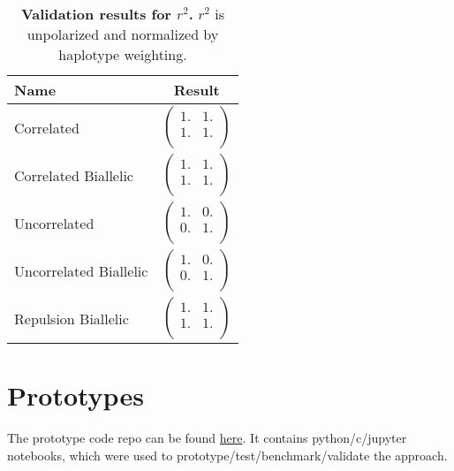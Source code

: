 \documentclass[12pt]{article}
\begin{document}
\begin{table}[H]
  \begin{tabular}{lc} Name & Result \\
    \hline
    Correlated & $\left(\begin{array}{cc}
                          1. & 1. \\
                          1. & 1. \\
                        \end{array}\right)$ \\
    Correlated Biallelic & $\left(\begin{array}{cc}
                                    1. & 1. \\
                                    1. & 1. \\
                                  \end{array}\right)$ \\
    Uncorrelated & $\left(\begin{array}{cc}
                            1. & 0. \\
                            0. & 1. \\
                          \end{array}\right)$ \\
    Uncorrelated Biallelic & $\left(\begin{array}{cc}
                                      1. & 0. \\
                                      0. & 1. \\
                                    \end{array}\right)$ \\
    Repulsion Biallelic & $\left(\begin{array}{cc}
                                   1. & 1. \\
                                   1. & 1. \\
                                 \end{array}\right)$ \\
  \end{tabular}
  \caption{
    \textbf{Validation results for $r^2$.}
    $r^2$ is unpolarized and normalized by haplotype weighting.
  }
\end{table}

\section{Prototypes}
The prototype code repo can be found
\href{https://github.com/lkirk/ts-two-locus-proto/}{here}. It contains
python/c/jupyter notebooks, which were used to prototype/test/benchmark/validate
the approach.
\end{document}

